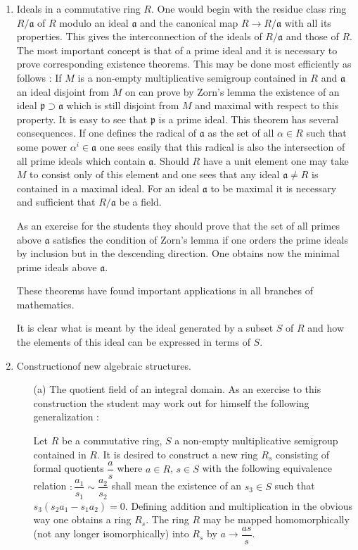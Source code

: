 \begin{enumerate}[(1)]
\item Ideals in a commutative ring $R$. One would begin with the
  residue class ring $R/\mathfrak{a}$ of $R$ modulo an ideal
  $\mathfrak{a}$ and the canonical map $R \to R / \mathfrak{a}$ with
  all its properties. This gives the interconnection of the ideals of
  $R/\mathfrak{a}$ and those of $R$. The most important concept is
  that of a prime ideal and it is necessary to prove corresponding
  existence theorems. This may be done most efficiently as follows :
  If $M$ is a non-empty multiplicative semigroup contained in $R$ and
  $\mathfrak{a}$ an ideal disjoint from $M$ on can prove by Zorn's
  lemma the existence of an ideal $\mathfrak{p}\supset \mathfrak{a}$
  which is still disjoint from $M$ and maximal with respect to this
  property. It is easy to see that $\mathfrak{p}$ is a prime
  ideal. This theorem has several consequences. If one defines the
  radical of $\mathfrak{a}$ as the set of all $\alpha \in R$ such that
  some power $\alpha^i \in \mathfrak{a}$ one sees easily that this
  radical is also the intersection of all prime ideals which contain
  $\mathfrak{a}$. Should $R$ have a unit element one may take $M$ to
  consist only of this element and one sees that any ideal
  $\mathfrak{a} \neq R$ is contained in a maximal ideal. For an ideal
  $\mathfrak{a}$ to be maximal it is necessary and sufficient that
  $R/\mathfrak{a}$ be a field.


As an exercise for the students they should prove that the set of all
primes above $\mathfrak{a}$ satisfies the condition of Zorn's lemma if
one orders the prime ideals by inclusion but in the descending
direction. One obtains now the minimal prime ideals above $\mathfrak{a}$.

These theorems have found important applications in all branches of
mathematics. 

It is clear what is meant by the ideal generated by a subset $S$ of
$R$ and how the elements of this ideal can be expressed in terms of $S$.

\item Construction\pageoriginale of new algebraic structures.

\begin{itemize}
\item[(a)] The quotient field of an integral domain. As an exercise to
  this construction the student may work out for himself the following
  generalization :

Let $R$ be a commutative ring, $S$ a non-empty multiplicative
semigroup contained in $R$. It is desired to construct a new ring
$R_s$ consisting of formal quotients $\dfrac{a}{s}$ where $a \in R$,
$s \in S$ with the following equivalence relation $: \dfrac{a_1}{s_1}
\sim \dfrac{a_2}{s_2}$ shall mean the existence of an $s_3 \in S$ such
that $s_3 (s_2 a_1 - s_1 a_2) = 0$. Defining addition and
multiplication in the obvious way one obtains a ring $R_s$. The ring
$R$ may be mapped homomorphically (not any longer isomorphically) into
$R_s$ by $a \to \dfrac{as}{s}$.


\end{itemize}
\end{enumerate}

